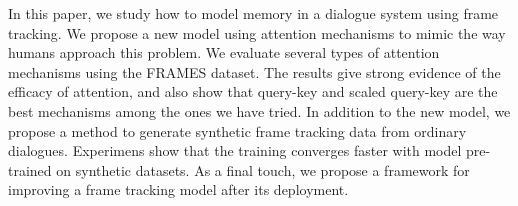 In this paper, we study how to model memory in a dialogue system using frame tracking. We propose a new model using attention mechanisms to mimic the way humans approach this problem. We evaluate several types of attention mechanisms using the FRAMES dataset. The results give strong evidence of the efficacy of attention, and also show that query-key and scaled query-key are the best mechanisms among the ones we have tried. In addition to the new model, we propose a method to generate synthetic frame tracking data from ordinary dialogues. Experimens show that the training converges faster with model pre-trained on synthetic datasets. As a final touch, we propose a framework for improving a frame tracking model after its deployment.